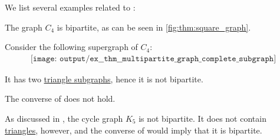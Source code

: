 \begin{example}\label{ex:thm:multipartite_graph_complete_subgraph}
  We list several examples related to :
  \begin{thmenum}
     The graph \( C_4 \) is bipartite, as can be seen in \cref{fig:thm:square_graph}.

    Consider the following supergraph of \( C_4 \):
    \begin{equation}\label{eq:ex:thm:multipartite_graph_complete_subgraph/triangle}
      \begin{aligned}
        \texttt{[image: output/ex\_\_thm\_\_multipartite\_graph\_complete\_subgraph]}
      \end{aligned}
    \end{equation}

    It has two \hyperref[def:triangle_graph]{triangle subgraphs}, hence it is not bipartite.

     The converse of  does not hold.

    As discussed in , the cycle graph \( K_5 \) is not bipartite. It does not contain \hyperref[def:triangle_graph]{triangles}, however, and the converse of  would imply that it is bipartite.
  \end{thmenum}
\end{example}

